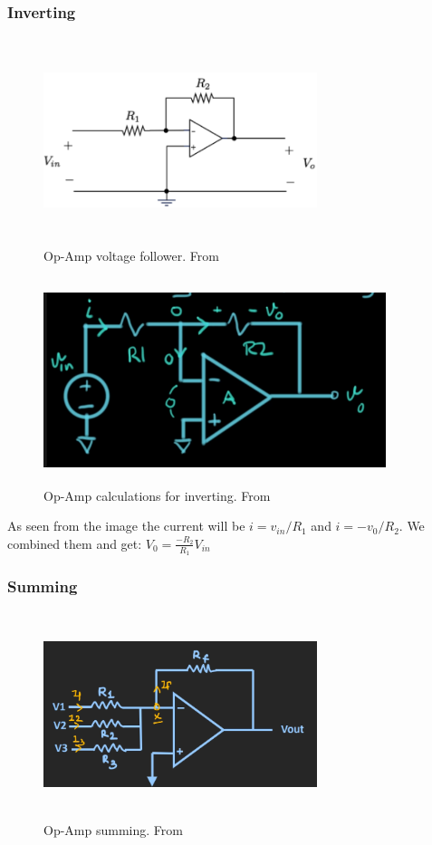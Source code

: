 \newpage
\subsubsection{Inverting}
\begin{figure}[h]
    \vspace{10mm}
    \centering
    \includegraphics[width=8cm, height=6cm]{image/op-amp-inverting.png}
    \caption{Op-Amp voltage follower. From \cite{}}
\end{figure}

\begin{figure}[h]
    \vspace{10mm}
    \centering
    \includegraphics[width=10cm, height=6cm]{image/op-amp-calc-inverting.png}
    \caption{Op-Amp calculations for inverting. From \cite{}}
\end{figure}
As seen from the image the current will be $i=v_{in}/R_1$ and $i=-v_0/R_2$. We combined them and get:
$V_0=\frac{-R_2}{R_1}V_{in}$

\newpage
\subsubsection{Summing}
\begin{figure}[h]
    \vspace{10mm}
    \centering
    \includegraphics[width=8cm, height=6cm]{image/op-amp-summing.png}
    \caption{Op-Amp summing. From \cite{}}
\end{figure}

